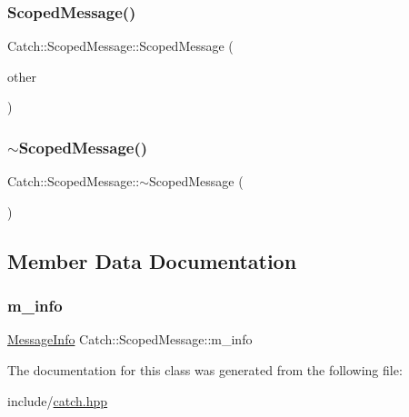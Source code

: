 \mbox{\label{class_catch_1_1_scoped_message_ae03a17fd47220d563d4abc73e7518e29}} 
\subsubsection{\texorpdfstring{Scoped\+Message()}{ScopedMessage()}\hspace{0.1cm}{\footnotesize\ttfamily [2/2]}}
{\footnotesize\ttfamily Catch\+::\+Scoped\+Message\+::\+Scoped\+Message (\begin{DoxyParamCaption}\item[{\mbox{\hyperlink{class_catch_1_1_scoped_message}{Scoped\+Message}} const \&}]{other }\end{DoxyParamCaption})}

\mbox{\label{class_catch_1_1_scoped_message_a43190843f9eeb84a0b42b0bc95fdf93a}} 
\subsubsection{\texorpdfstring{$\sim$\+Scoped\+Message()}{~ScopedMessage()}}
{\footnotesize\ttfamily Catch\+::\+Scoped\+Message\+::$\sim$\+Scoped\+Message (\begin{DoxyParamCaption}{ }\end{DoxyParamCaption})}



\subsection{Member Data Documentation}
\mbox{\label{class_catch_1_1_scoped_message_ae6e1476f389cc6e1586f033b3747b27b}} 
\subsubsection{\texorpdfstring{m\+\_\+info}{m\_info}}
{\footnotesize\ttfamily \mbox{\hyperlink{struct_catch_1_1_message_info}{Message\+Info}} Catch\+::\+Scoped\+Message\+::m\+\_\+info}



The documentation for this class was generated from the following file\+:\begin{DoxyCompactItemize}
\item 
include/\mbox{\hyperlink{catch_8hpp}{catch.\+hpp}}\end{DoxyCompactItemize}
